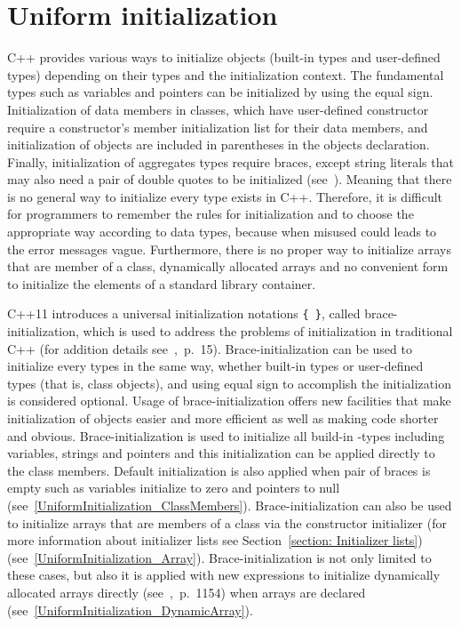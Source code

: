 \documentclass[11pt]{report}
\begin{document}
\section{Uniform initialization}
\label{section:Uniform initialization}
C++ provides various ways to initialize objects (built-in types and user-defined types) depending on their types and the initialization context. The fundamental types such as variables and pointers can be initialized by using the equal sign. Initialization of data members in classes, which have user-defined constructor require a constructor's member initialization list for their data members, and initialization of objects are included in parentheses in the objects declaration. Finally, initialization of aggregates types require braces, except string literals that may also need a pair of double quotes to be initialized (see~\cite{Stroustrup:2012:Cpp11}). Meaning that there is no general way to initialize every type exists in C++. Therefore, it is difficult for programmers to remember the rules for initialization and to choose the appropriate way according to data types, because when misused could leads to the error messages vague. Furthermore, there is no proper way to initialize arrays that are member of a class, dynamically allocated arrays and no convenient form to initialize the elements of a standard library container.

C++11 introduces a universal initialization notations \texttt{\{ \}}, called brace-initialization, which is used to address the problems of initialization in traditional C++ (for addition details see~\cite{Reddy:2011:API},~p.~15). Brace-initialization can be used to initialize every types in the same way, whether built-in types or user-defined types (that is, class objects), and using equal sign to accomplish the initialization is considered optional. Usage of brace-initialization offers new facilities that make initialization of objects easier and more efficient as well as making code shorter and obvious.
Brace-initialization is used to initialize all build-in -types including variables, strings and pointers and this initialization can be applied directly to the class members. Default initialization is also applied when pair of braces is empty such as variables initialize to zero and pointers to null (see~\ref{UniformInitialization_ClassMembers}). Brace-initialization can also be used to initialize arrays that are members of a class via the constructor initializer (for more information about initializer lists see Section~\ref{section: Initializer lists}) (see~\ref{UniformInitialization_Array}). Brace-initialization is not only limited to these cases, but also it is applied with new expressions to initialize dynamically allocated arrays directly (see~\cite{Prata:2012:Cpp},~p.~1154) when arrays are declared (see~\ref{UniformInitialization_DynamicArray}).
\end{document}
